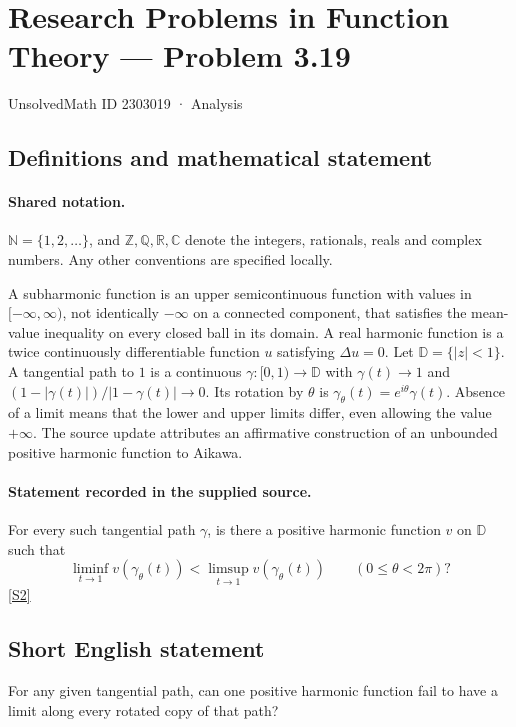 \documentclass[11pt]{article}
\newcommand{\sref}[2]{\hyperlink{source:#1:#2}{[S#2]}}
\begin{document}
\setcounter{section}{2303018}
\section{Research Problems in Function Theory — Problem 3.19}\label{2303019}
{\small\sffamily UnsolvedMath ID 2303019 · Analysis}
\subsection{Definitions and mathematical statement}

\paragraph{Shared notation.}$\mathbb N=\{1,2,\ldots\}$, and $\mathbb Z,\mathbb Q,\mathbb R,\mathbb C$ denote the integers, rationals, reals and complex numbers. Any other conventions are specified locally.


A subharmonic function is an upper semicontinuous function with values in $[-\infty,\infty)$, not identically $-\infty$ on a connected component, that satisfies the mean-value inequality on every closed ball in its domain. A real harmonic function is a twice continuously differentiable function $u$ satisfying $\Delta u=0$. Let $\mathbb D=\{|z|<1\}$. A tangential path to $1$ is a continuous $\gamma:[0,1)\to\mathbb D$ with $\gamma(t)\to1$ and $(1-|\gamma(t)|)/|1-\gamma(t)|\to0$. Its rotation by $\theta$ is $\gamma_\theta(t)=e^{i\theta}\gamma(t)$. Absence of a limit means that the lower and upper limits differ, even allowing the value $+\infty$.
The source update attributes an affirmative construction of an unbounded positive harmonic function to Aikawa.
\paragraph{Statement recorded in the supplied source.}
For every such tangential path $\gamma$, is there a positive harmonic function $v$ on $\mathbb D$ such that
\[\liminf_{t\to1}v(\gamma_\theta(t))<\limsup_{t\to1}v(\gamma_\theta(t))\qquad(0\leq\theta<2\pi)?\] \sref{2303019}{2}
\subsection{Short English statement}
For any given tangential path, can one positive harmonic function fail to have a limit along every rotated copy of that path?
\end{document}
